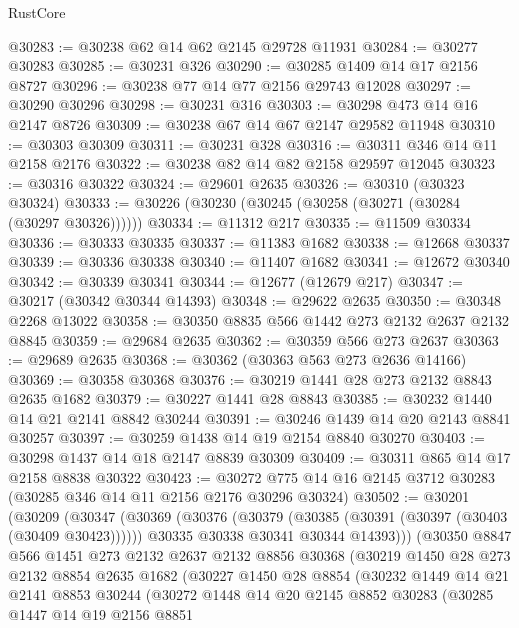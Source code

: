 \begin{lexlean}{RustCore}
\begin{coremodule}
@30283 := @30238 @62 @14 @62 @2145 @29728 @11931
@30284 := @30277 @30283
@30285 := @30231 @326
@30290 := @30285 @1409 @14 @17 @2156 @8727
@30296 := @30238 @77 @14 @77 @2156 @29743 @12028
@30297 := @30290 @30296
@30298 := @30231 @316
@30303 := @30298 @473 @14 @16 @2147 @8726
@30309 := @30238 @67 @14 @67 @2147 @29582 @11948
@30310 := @30303 @30309
@30311 := @30231 @328
@30316 := @30311 @346 @14 @11 @2158 @2176
@30322 := @30238 @82 @14 @82 @2158 @29597 @12045
@30323 := @30316 @30322
@30324 := @29601 @2635
@30326 := @30310 (@30323 @30324)
@30333 := @30226 (@30230 (@30245 (@30258 (@30271 (@30284 (@30297 @30326))))))
@30334 := @11312 @217
@30335 := @11509 @30334
@30336 := @30333 @30335
@30337 := @11383 @1682
@30338 := @12668 @30337
@30339 := @30336 @30338
@30340 := @11407 @1682
@30341 := @12672 @30340
@30342 := @30339 @30341
@30344 := @12677 (@12679 @217)
@30347 := @30217 (@30342 @30344 @14393)
@30348 := @29622 @2635
@30350 := @30348 @2268 @13022
@30358 := @30350 @8835 @566 @1442 @273 @2132 @2637 @2132 @8845
@30359 := @29684 @2635
@30362 := @30359 @566 @273 @2637
@30363 := @29689 @2635
@30368 := @30362 (@30363 @563 @273 @2636 @14166)
@30369 := @30358 @30368
@30376 := @30219 @1441 @28 @273 @2132 @8843 @2635 @1682
@30379 := @30227 @1441 @28 @8843
@30385 := @30232 @1440 @14 @21 @2141 @8842 @30244
@30391 := @30246 @1439 @14 @20 @2143 @8841 @30257
@30397 := @30259 @1438 @14 @19 @2154 @8840 @30270
@30403 := @30298 @1437 @14 @18 @2147 @8839 @30309
@30409 := @30311 @865 @14 @17 @2158 @8838 @30322
@30423 := @30272 @775 @14 @16 @2145 @3712 @30283 (@30285 @346 @14 @11 @2156 @2176 @30296 @30324)
@30502 := @30201
    (@30209
      (@30347
        (@30369
          (@30376
            (@30379 (@30385 (@30391 (@30397 (@30403 (@30409 @30423))))))
            @30335
            @30338
            @30341
            @30344
            @14393)))
      (@30350
        @8847
        @566
        @1451
        @273
        @2132
        @2637
        @2132
        @8856
        @30368
        (@30219
          @1450
          @28
          @273
          @2132
          @8854
          @2635
          @1682
          (@30227
            @1450
            @28
            @8854
            (@30232
              @1449
              @14
              @21
              @2141
              @8853
              @30244
              (@30272
                @1448
                @14
                @20
                @2145
                @8852
                @30283
                (@30285
                  @1447
                  @14
                  @19
                  @2156
                  @8851

\end{coremodule}
\end{lexlean}
